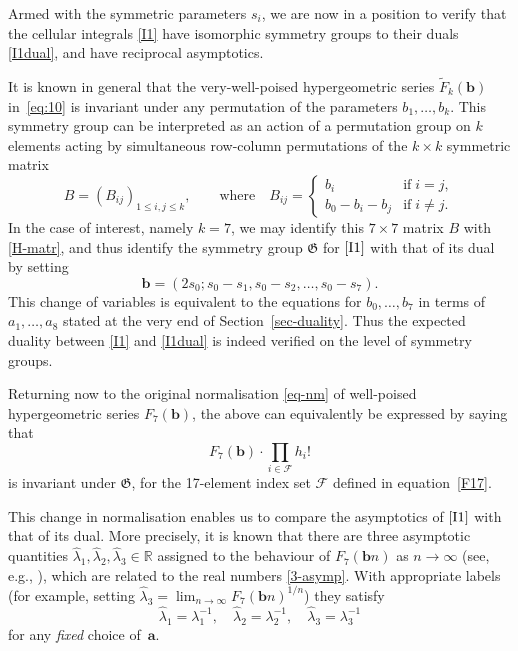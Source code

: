 \documentclass[12pt,reqno]{amsart}
\theoremstyle{remark}
\newcommand\ba{\boldsymbol a}
\newcommand\bb{\boldsymbol b}
\newcommand\cF{\mathcal F}
\newcommand\frG{\mathfrak G}
\begin{document}
Armed with the symmetric parameters $s_i$, we are now in a position to verify that the cellular integrals \eqref{I1} have isomorphic symmetry groups to their duals \eqref{I1dual}, and have reciprocal asymptotics.

It is known in general that the  very-well-poised hypergeometric series $\tilde F_k(\bb)$ in~\eqref{eq:10} is invariant under  any permutation of the parameters $b_1,\dots,b_k$. This symmetry group   can be interpreted as an action of a permutation group on $k$ elements acting by simultaneous row-column permutations of the $k\times k$ symmetric matrix
\begin{equation*}
B=(B_{ij})_{1\le i,j\le k},
\qquad\text{where}\quad
B_{ij}=\begin{cases}
b_i &\text{if}\; i=j, \\[2.5pt]
b_0-b_i-b_j &\text{if}\; i\ne j.
\end{cases}
\end{equation*}
In the case of interest, namely $k=7$, we may identify  this $7\times7$ matrix $B$ with \eqref{H-matr}, and thus identify the symmetry group $\frG$ for $\eqref{I1}$ with that of its dual  
by setting 
\[
\bb=(2s_0;s_0-s_1,s_0-s_2,\dots,s_0-s_7) .
\]
This change of variables  is equivalent to the equations for $b_0,\ldots, b_7$ in terms of $a_1,\ldots, a_8$ stated at the very end of Section~\ref{sec-duality}. Thus the expected duality between \eqref{I1} and \eqref{I1dual} is indeed verified on the level of symmetry groups. 








Returning now to the original normalisation \eqref{eq-nm} of well-poised hypergeometric series $F_{7}(\bb)$, the above can   equivalently be expressed by  saying that 
\[
F_7(\bb)\cdot\prod_{i\in\cF}h_i!
\]
is invariant under $\frG$, for the 17-element index set $\cF$ defined in equation~\eqref{F17}.


This change in normalisation enables us to compare  the asymptotics of $\eqref{I1}$ with that of its dual.  
More precisely, it is known that there are three asymptotic quantities $\hat\lambda_1,\hat\lambda_2,\hat\lambda_3\in\mathbb R$ assigned to the behaviour of $F_7(\bb n)$
as $n\to\infty$ (see, e.g., \cite{Zu02a,Zu03}), which are related to the real numbers \eqref{3-asymp}. 
 With appropriate  labels (for example, setting $\hat\lambda_3=\lim_{n\to\infty}F_7(\bb n)^{1/n}$) they satisfy
\[
\hat\lambda_1=\lambda_1^{-1}, \quad
\hat\lambda_2=\lambda_2^{-1}, \quad
\hat\lambda_3=\lambda_3^{-1}
\]
for any \emph{fixed} choice of~$\ba$.
\end{document}
